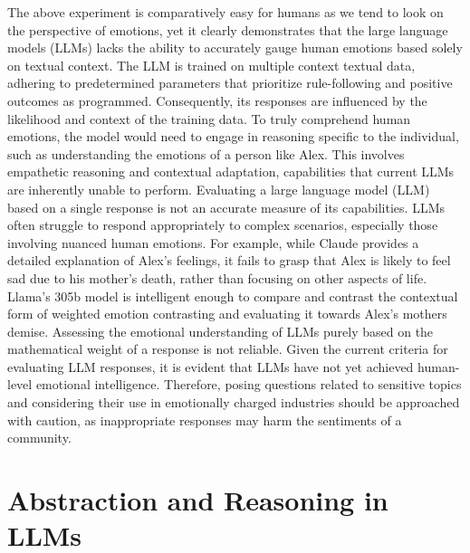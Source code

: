 \documentclass[pdflatex,sn-mathphys-num]{sn-jnl}%
\theoremstyle{thmstyleone}%
\theoremstyle{thmstyletwo}%
\theoremstyle{thmstylethree}%
\begin{document}
The above experiment is comparatively easy for humans as we tend to look on the perspective of emotions, yet it clearly demonstrates that the large language models (LLMs) lacks the ability to accurately gauge human emotions based solely on textual context. The LLM is trained on multiple context textual data, adhering to predetermined parameters that prioritize rule-following and positive outcomes as programmed. Consequently, its responses are influenced by the likelihood and context of the training data. To truly comprehend human emotions, the model would need to engage in reasoning specific to the individual, such as understanding the emotions of a person like Alex. This involves empathetic reasoning and contextual adaptation, capabilities that current LLMs are inherently unable to perform. Evaluating a large language model (LLM) based on a single response is not an accurate measure of its capabilities. LLMs often struggle to respond appropriately to complex scenarios, especially those involving nuanced human emotions. For example, while Claude provides a detailed explanation of Alex's feelings, it fails to grasp that Alex is likely to feel sad due to his mother's death, rather than focusing on other aspects of life. Llama's 305b model is intelligent enough to compare and contrast the contextual form of weighted emotion contrasting and evaluating it towards Alex's mothers demise. Assessing the emotional understanding of LLMs purely based on the mathematical weight of a response is not reliable. Given the current criteria for evaluating LLM responses, it is evident that LLMs have not yet achieved human-level emotional intelligence. Therefore, posing questions related to sensitive topics and considering their use in emotionally charged industries should be approached with caution, as inappropriate responses may harm the sentiments of a community.

\section{Abstraction and Reasoning in LLMs}
\end{document}
